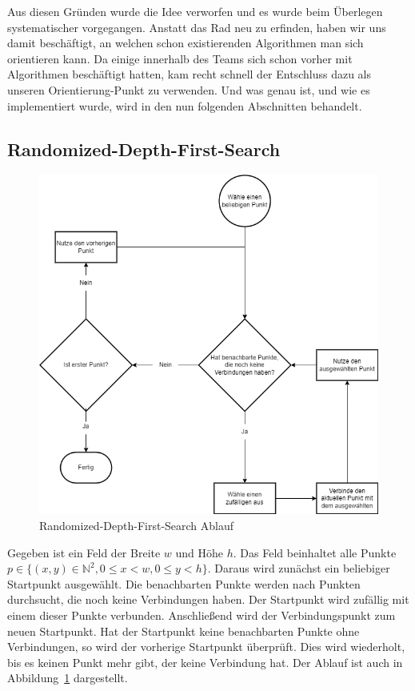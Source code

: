 Aus diesen Gründen wurde die Idee verworfen und es wurde beim Überlegen systematischer vorgegangen. Anstatt das Rad neu zu erfinden, haben wir uns damit beschäftigt, an welchen schon existierenden Algorithmen man sich orientieren kann.
Da einige innerhalb des Teams sich schon vorher mit Algorithmen beschäftigt hatten, kam recht schnell der Entschluss dazu  als unseren Orientierung-Punkt zu verwenden.
Und was  genau ist, und wie es implementiert wurde, wird in den nun folgenden Abschnitten behandelt.



\subsection{Randomized-Depth-First-Search}\label{subsec:randomized-depth-first-search}
    \begin{figure}[ht!]
        \centering
        \includegraphics[width=\paperwidth/2]{../assets/img/Randomised-Depth-First-Search}
        \caption{Randomized-Depth-First-Search Ablauf}
        \label{fig:randomized-depth-first-search-flow}
    \end{figure}
Gegeben ist ein Feld der Breite $w$ und Höhe $h$.
Das Feld beinhaltet alle Punkte $p\in\{(x,y)\in\mathbb{N}^2, 0\leq x<w, 0\leq y<h\}$.
Daraus wird zunächst ein beliebiger Startpunkt ausgewählt.
Die benachbarten Punkte werden nach Punkten durchsucht, die noch keine Verbindungen haben.
Der Startpunkt wird zufällig mit einem dieser Punkte verbunden.
Anschließend wird der Verbindungspunkt zum neuen Startpunkt.
Hat der Startpunkt keine benachbarten Punkte ohne Verbindungen, so wird der vorherige Startpunkt überprüft.
Dies wird wiederholt, bis es keinen Punkt mehr gibt, der keine Verbindung hat.
Der Ablauf ist auch in Abbildung~\ref{fig:randomized-depth-first-search-flow} dargestellt.

